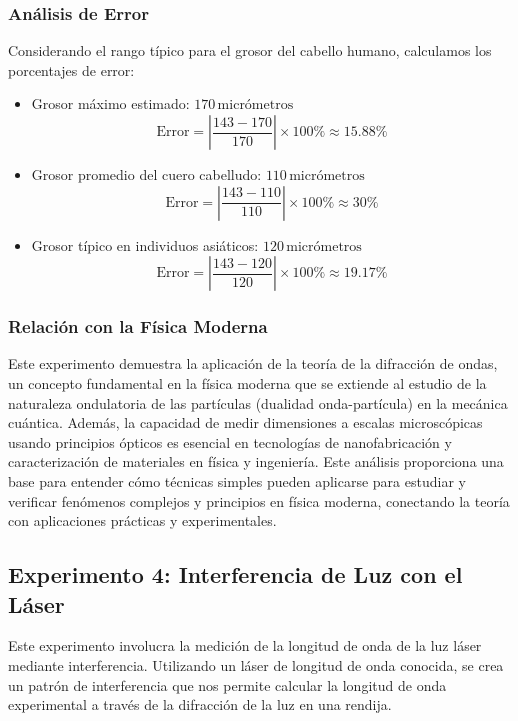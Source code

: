 \subsubsection{Análisis de Error}
Considerando el rango típico para el grosor del cabello humano, calculamos los porcentajes de error:
\begin{itemize}
    \item Grosor máximo estimado: \(170 \, \text{micrómetros}\)
    \[
    \text{Error} = \left| \frac{143 - 170}{170} \right| \times 100\% \approx 15.88\%
    \]
    \item Grosor promedio del cuero cabelludo: \(110 \, \text{micrómetros}\)
    \[
    \text{Error} = \left| \frac{143 - 110}{110} \right| \times 100\% \approx 30\%
    \]
    \item Grosor típico en individuos asiáticos: \(120 \, \text{micrómetros}\)
    \[
    \text{Error} = \left| \frac{143 - 120}{120} \right| \times 100\% \approx 19.17\%
    \]
\end{itemize}

\subsubsection{Relación con la Física Moderna}
Este experimento demuestra la aplicación de la teoría de la difracción de ondas, un concepto fundamental en la física moderna que se extiende al estudio de la naturaleza ondulatoria de las partículas (dualidad onda-partícula) en la mecánica cuántica. Además, la capacidad de medir dimensiones a escalas microscópicas usando principios ópticos es esencial en tecnologías de nanofabricación y caracterización de materiales en física y ingeniería. Este análisis proporciona una base para entender cómo técnicas simples pueden aplicarse para estudiar y verificar fenómenos complejos y principios en física moderna, conectando la teoría con aplicaciones prácticas y experimentales.

\subsection{Experimento 4: Interferencia de Luz con el Láser}

Este experimento involucra la medición de la longitud de onda de la luz láser mediante interferencia. Utilizando un láser de longitud de onda conocida, se crea un patrón de interferencia que nos permite calcular la longitud de onda experimental a través de la difracción de la luz en una rendija.

